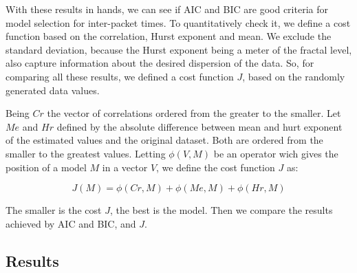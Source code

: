 With these results in hands, we can see if AIC and BIC are good criteria for model selection for inter-packet times. To quantitatively check it, we define a cost function based on the correlation, Hurst exponent and mean. We exclude the standard deviation, because the Hurst exponent being a meter of the fractal level, also capture information about the desired dispersion of the data. So, for comparing all these results, we defined a cost function $J$, based on the randomly generated data values.

Being $Cr$ the vector of correlations ordered from the greater to the smaller. Let $Me$ and $Hr$ defined by the absolute difference between mean and hurt exponent of the estimated values and the original dataset. Both are ordered from the smaller to the greatest values. Letting $\phi(V, M)$ be an operator wich gives the position of a model $M$ in a vector $V$, we define the cost function $J$ as:


\begin{equation}
J(M) = \phi(Cr, M) + \phi(Me, M) + \phi(Hr, M)
\end{equation}

The smaller is the cost $J$, the best is the model. Then we compare the results achieved by AIC and BIC, and $J$.

\subsection{Results}



